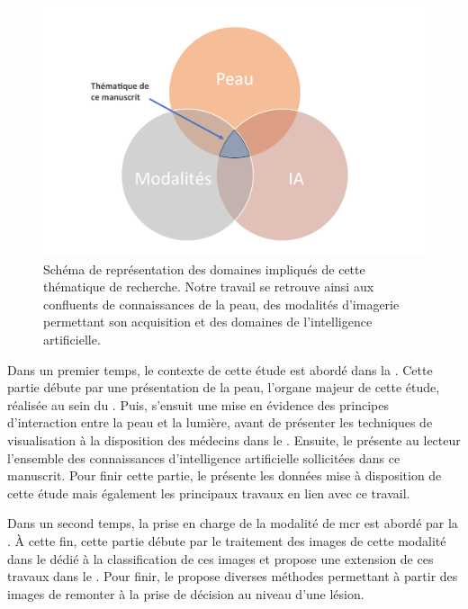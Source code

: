 \begin{figure}[H]
    \centering
    \includegraphics[width=0.8\linewidth]{contents/i_introduction/resources/scheme_our_work.pdf}
    \caption{Schéma de représentation des domaines impliqués de cette thématique de recherche. Notre travail se retrouve ainsi aux confluents de connaissances de la peau, des modalités d'imagerie permettant son acquisition et des domaines de l'intelligence artificielle.}
    \label{fig:scheme_our_work}
\end{figure}\par

Dans un premier temps, le contexte de cette étude est abordé dans la . Cette partie débute par une présentation de la peau, l'organe majeur de cette étude, réalisée au sein du . Puis, s'ensuit une mise en évidence des principes d'interaction entre la peau et la lumière, avant de présenter les techniques de visualisation à la disposition des médecins dans le . Ensuite, le  présente au lecteur l'ensemble des connaissances d'intelligence artificielle sollicitées dans ce manuscrit. Pour finir cette partie, le  présente les données mise à disposition de cette étude mais également les principaux travaux en lien avec ce travail.\par

Dans un second temps, la prise en charge de la modalité de \gls{mcr} est abordé par la . À cette fin, cette partie débute par le traitement des images de cette modalité dans le  dédié à la classification de ces images et propose une extension de ces travaux dans le . Pour finir, le  propose diverses méthodes permettant à partir des images de remonter à la prise de décision au niveau d'une lésion.\par

